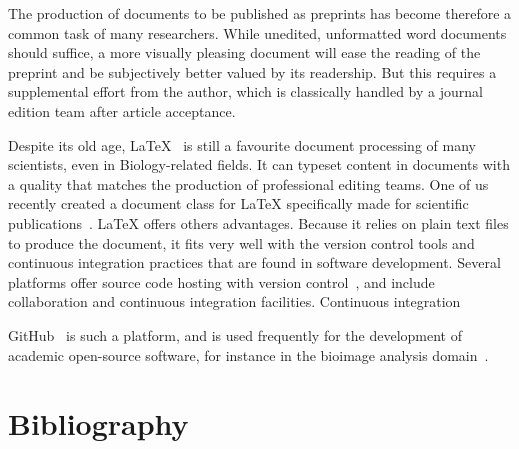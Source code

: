 The production of documents to be published as preprints has become therefore a common task of many researchers.
While unedited, unformatted word documents should suffice, a more visually pleasing document will ease the reading of the preprint and be subjectively better valued by its readership.
But this requires a supplemental effort from the author, which is classically handled by a journal edition team after article acceptance.

Despite its old age, LaTeX~\cite{Lamport1994} is still a favourite document processing of many scientists, even in Biology-related fields.
It can typeset content in documents with a quality that matches the production of professional editing teams.
One of us recently created a document class for LaTeX specifically made for scientific publications~\cite{HenriquesPreprintTemplate}.
LaTeX offers others advantages.
Because it relies on plain text files to produce the document, it fits very well with the version control tools and continuous integration practices that are found in software development.
Several platforms offer source code hosting with version control~\cite{SourceForge, Mercurial, GitHub, Bitbucket, GitLab}, and include collaboration  and continuous integration facilities. 
Continuous integration \TODO

GitHub~\cite{GitHub} is such a platform, and is used frequently for the development of academic open-source software, for instance in the bioimage analysis domain~\cite{FijiPaper, IcyPaper, ImgLib2Paper}.





\section*{Bibliography}


